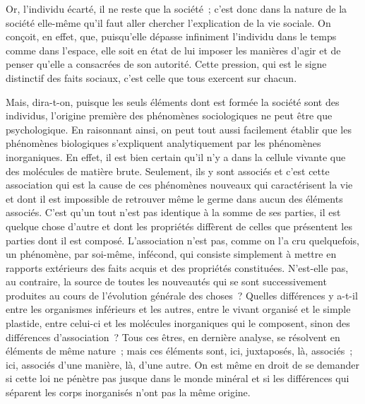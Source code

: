 \documentclass[french,twoside]{book} %
\begin{document}
Or, l’individu écarté, il ne reste que la société ; c’est donc dans la nature de la société elle-même qu’il faut aller chercher l’explication de la vie sociale. On conçoit, en effet, que, puisqu’elle dépasse infiniment l’individu dans le temps comme dans l’espace, elle soit en état de lui imposer les manières d’agir et de penser qu’elle a consacrées de son autorité. Cette pression, qui est le signe distinctif des faits sociaux, c’est celle que tous exercent sur chacun.\par
Mais, dira-t-on, puisque les seuls éléments dont est formée la société sont des individus, l’origine première des phénomènes sociologiques ne peut être que psychologique. En raisonnant ainsi, on peut tout aussi facilement établir que les phénomènes biologiques s’expliquent analytiquement par les phénomènes inorganiques. En effet, il est bien certain qu’il n’y a dans la cellule vivante que des molécules de matière brute. Seulement, ils y sont associés et c’est cette association qui est la cause de ces phénomènes nouveaux qui caractérisent la vie et dont il est impossible de retrouver même le germe dans aucun des éléments associés. C’est qu’un tout n’est pas identique à la somme de ses parties, il est quelque chose d’autre et dont les propriétés diffèrent de celles que présentent les parties dont il est composé. L’association n’est pas, comme on l’a cru quelquefois, un phénomène, par soi-même, infécond, qui consiste simplement à mettre en rapports extérieurs des faits acquis et des propriétés constituées. N’est-elle pas, au contraire, la source de toutes les nouveautés qui se sont successivement produites au cours de l’évolution générale des choses ? Quelles différences y a-t-il entre les organismes inférieurs et les autres, entre le vivant organisé et le simple plastide, entre celui-ci et les molécules inorganiques qui le composent, sinon des différences d’association ? Tous ces êtres, en dernière analyse, se résolvent en éléments de même nature ; mais ces éléments sont, ici, juxtaposés, là, associés ; ici, associés d’une manière, là, d’une autre. On est même en droit de se demander si cette loi ne pénètre pas jusque dans le monde minéral et si les différences qui séparent les corps inorganisés n’ont pas la même origine.\par
\end{document}
